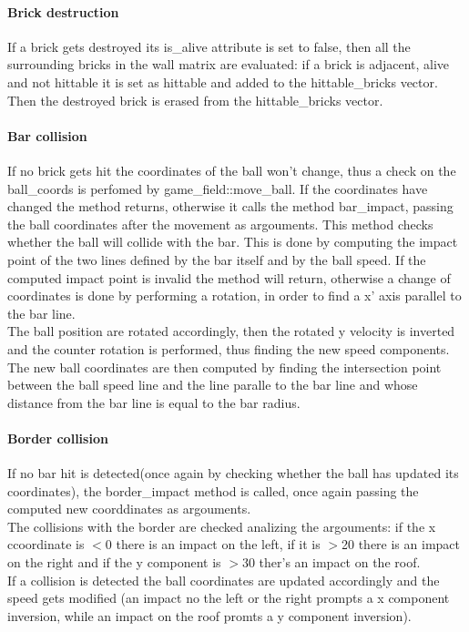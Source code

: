 \documentclass[]{article}
\begin{document}
\paragraph{Brick destruction}
If a brick gets destroyed its is\_alive attribute is set to false, then all the surrounding bricks in the wall matrix are evaluated: if a brick is adjacent, alive and not hittable it is set as hittable and added to the hittable\_bricks vector.
Then the destroyed brick is erased from the hittable\_bricks vector.
\paragraph{Bar collision}
If no brick gets hit the coordinates of the ball won't change, thus a check on the ball\_coords is perfomed by game\_field::move\_ball. 
If the coordinates have changed the method returns, otherwise it calls the method bar\_impact, passing the ball coordinates after the movement as argouments. This method checks 
whether the ball will collide with the bar. This is done by computing the impact point of the two lines defined by the bar itself and by the ball speed.
If the computed impact point is invalid the method will return, otherwise a change of coordinates is done by performing a rotation, in order to find a x' axis parallel to the bar line.\\
The ball position are rotated accordingly, then the rotated y velocity is inverted and the counter rotation is performed, thus finding the new speed components.\\
The new ball coordinates are then computed by finding the intersection point between the ball speed line and the line paralle to the bar line and whose distance from the bar line is equal to the bar radius.\\

\paragraph{Border collision}
If no bar hit is detected(once again by checking whether the ball has updated its coordinates), the border\_impact method is called, once again passing the computed new coorddinates as argouments.\\
The collisions with the border are checked analizing the argouments: if the x ccoordinate is $<$0 there is an impact on the left, if it is $>$20 there is an impact on the right and if the y component is $>$30 ther's an impact on the roof. \\
If a collision is detected the ball coordinates are updated accordingly and the speed gets modified (an impact no the left or the right prompts a x component inversion, while an impact on the roof promts a y component inversion).
\end{document}
